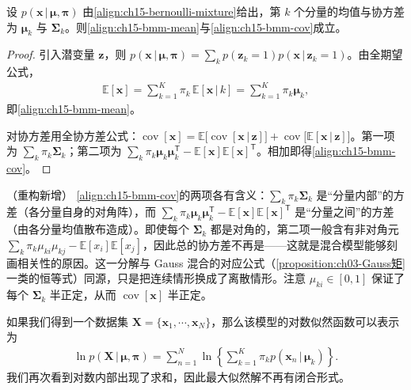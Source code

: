 \documentclass[../../main.tex]{subfiles}
\begin{document}
\begin{proposition}\label{proposition:ch15-Bernoulli混合矩}
设 $p(\bm{x}\,|\,\bm{\mu},\bm{\pi})$ 由\eqref{align:ch15-bernoulli-mixture}给出，第 $k$ 个分量的均值与协方差为 $\bm{\mu}_k$ 与 $\bm{\Sigma}_k$。则\eqref{align:ch15-bmm-mean}与\eqref{align:ch15-bmm-cov}成立。
\end{proposition}
\begin{proof}
引入潜变量 $\bm{z}$，则 $p(\bm{x}\,|\,\bm{\mu},\bm{\pi})=\sum_k p(\bm{z}_k=1)p(\bm{x}\,|\,\bm{z}_k=1)$。由全期望公式，
\begin{align*}
\mathbb{E}[\bm{x}]=\sum_{k=1}^{K}\pi_k\,\mathbb{E}[\bm{x}\,|\,k]=\sum_{k=1}^{K}\pi_k\bm{\mu}_k,
\end{align*}
即\eqref{align:ch15-bmm-mean}。

对协方差用全协方差公式：$\operatorname{cov}[\bm{x}]=\mathbb{E}\big[\operatorname{cov}[\bm{x}\,|\,\bm{z}]\big]+\operatorname{cov}\big[\mathbb{E}[\bm{x}\,|\,\bm{z}]\big]$。第一项为 $\sum_k\pi_k\bm{\Sigma}_k$；第二项为 $\sum_k\pi_k\bm{\mu}_k\bm{\mu}_k^{\mathsf T}-\mathbb{E}[\bm{x}]\mathbb{E}[\bm{x}]^{\mathsf T}$。相加即得\eqref{align:ch15-bmm-cov}。
\end{proof}

\begin{remark}（重构新增）
\eqref{align:ch15-bmm-cov}的两项各有含义：$\sum_k\pi_k\bm{\Sigma}_k$ 是“分量内部”的方差（各分量自身的对角阵），而 $\sum_k\pi_k\bm{\mu}_k\bm{\mu}_k^{\mathsf T}-\mathbb{E}[\bm{x}]\mathbb{E}[\bm{x}]^{\mathsf T}$ 是“分量之间”的方差（由各分量均值散布造成）。即使每个 $\bm{\Sigma}_k$ 都是对角的，第二项一般含有非对角元 $\sum_k\pi_k\mu_{ki}\mu_{kj}-\mathbb{E}[x_i]\mathbb{E}[x_j]$，因此总的协方差不再是——这就是混合模型能够刻画相关性的原因。这一分解与 Gauss 混合的对应公式（\cref{proposition:ch03-Gauss矩}一类的恒等式）同源，只是把连续情形换成了离散情形。注意 $\mu_{ki}\in[0,1]$ 保证了每个 $\bm{\Sigma}_k$ 半正定，从而 $\operatorname{cov}[\bm{x}]$ 半正定。
\end{remark}

如果我们得到一个数据集 $\bm{X}=\{\bm{x}_1,\cdots,\bm{x}_N\}$，那么该模型的对数似然函数可以表示为
\begin{align}
\ln p(\bm{X}\,|\,\bm{\mu},\bm{\pi})=\sum_{n=1}^{N}\ln\!\left\{\sum_{k=1}^{K}\pi_k p(\bm{x}_n\,|\,\bm{\mu}_k)\right\}.
\label{align:ch15-bmm-nll}
\end{align}
我们再次看到对数内部出现了求和，因此最大似然解不再有闭合形式。
\end{document}
